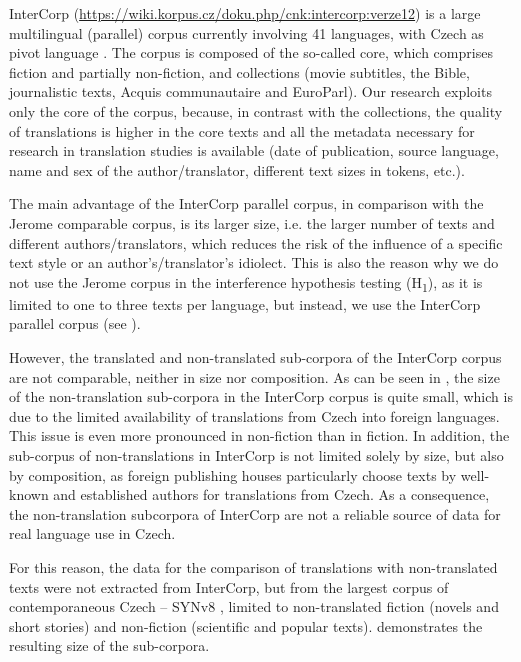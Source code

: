 \documentclass[output=paper,russian]{langsci/langscibook}
\begin{document}
InterCorp (\url{https://wiki.korpus.cz/doku.php/cnk:intercorp:verze12}) is a large multilingual (parallel) corpus currently involving 41 languages, with Czech as pivot language \parencites{cerros12}{nadvornikova16}. The corpus is composed of the so-called core, which comprises fiction and partially non-fiction, and collections (movie subtitles, the Bible, journalistic texts, Acquis communautaire and EuroParl). Our research exploits only the core of the corpus, because, in contrast with the collections, the quality of translations is higher in the core texts and all the metadata necessary for research in translation studies is available (date of publication, source language, name and sex of the author/translator, different text sizes in tokens, etc.). 

The main advantage of the InterCorp parallel corpus, in comparison with the Jerome comparable corpus, is its larger size, i.e. the larger number of texts and different authors/translators, which reduces the risk of the influence of a specific text style or an author's\slash translator's idiolect. This is also the reason why we do not use the Jerome corpus in the interference hypothesis testing (H\textsubscript{1}), as it is limited to one to three texts per language, but instead, we use the InterCorp parallel corpus (see ).

However, the translated and non-translated sub-corpora of the InterCorp corpus are not comparable, neither in size nor composition. As can be seen in , the size of the non-translation sub-corpora in the InterCorp corpus is quite small, which is due to the limited availability of translations from Czech into foreign languages. This issue is even more pronounced in non-fiction than in fiction. In addition, the sub-corpus of non-translations in InterCorp is not limited solely by size, but also by composition, as foreign publishing houses particularly choose texts by well-known and established authors for translations from Czech. As a consequence, the non-translation subcorpora of InterCorp are not a reliable source of data for real language use in Czech.

For this reason, the data for the comparison of translations with non-translated texts were not extracted from InterCorp, but from the largest corpus of contemporaneous Czech -- SYNv8 \parencites{kreetal19}{hnaetal14}, limited to non-translated fiction (novels and short stories) and non-fiction (scientific and popular texts).  demonstrates the resulting size of the sub-corpora.
\end{document}
